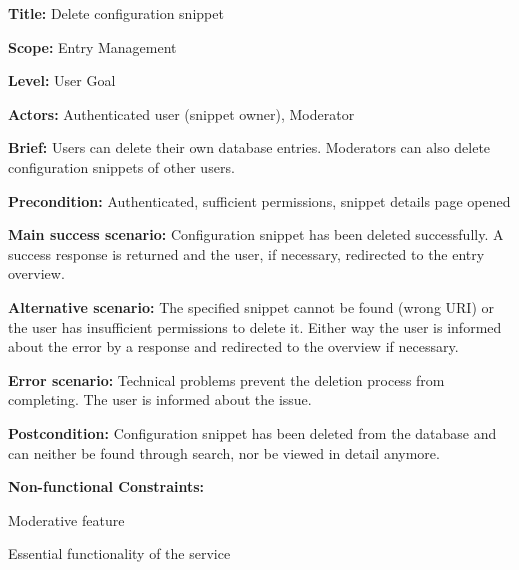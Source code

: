 
\begin{DoxyItemize}
\item {\bfseries Title\+:} Delete configuration snippet
\item {\bfseries Scope\+:} Entry Management
\item {\bfseries Level\+:} User Goal
\item {\bfseries Actors\+:} Authenticated user (snippet owner), Moderator
\item {\bfseries Brief\+:} Users can delete their own database entries. Moderators can also delete configuration snippets of other users.
\end{DoxyItemize}


\begin{DoxyItemize}
\item {\bfseries Precondition\+:} Authenticated, sufficient permissions, snippet details page opened
\item {\bfseries Main success scenario\+:} Configuration snippet has been deleted successfully. A success response is returned and the user, if necessary, redirected to the entry overview.
\item {\bfseries Alternative scenario\+:} The specified snippet cannot be found (wrong U\+RI) or the user has insufficient permissions to delete it. Either way the user is informed about the error by a response and redirected to the overview if necessary.
\item {\bfseries Error scenario\+:} Technical problems prevent the deletion process from completing. The user is informed about the issue.
\item {\bfseries Postcondition\+:} Configuration snippet has been deleted from the database and can neither be found through search, nor be viewed in detail anymore.
\item {\bfseries Non-\/functional Constraints\+:}
\begin{DoxyItemize}
\item Moderative feature
\item Essential functionality of the service 
\end{DoxyItemize}
\end{DoxyItemize}